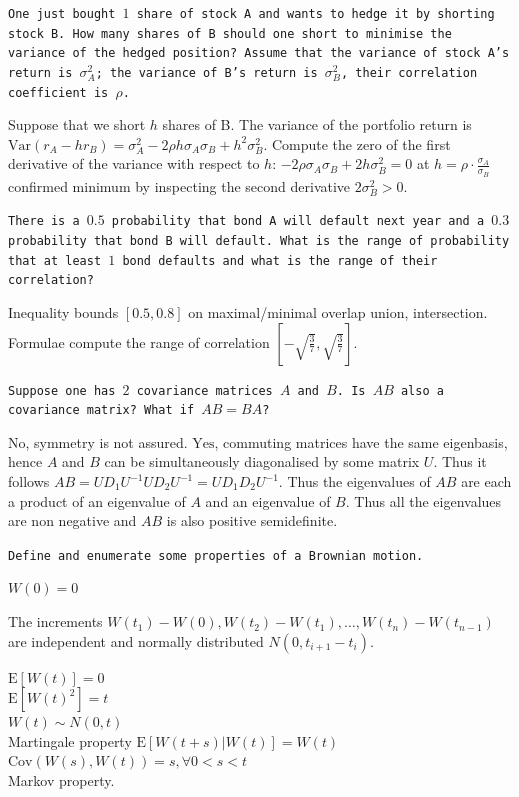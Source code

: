 \texttt{One just bought $1$ share of stock A and wants to hedge it by shorting stock B. How many shares of B should one short to minimise the variance of the hedged position? Assume that the variance of stock A's return is $\sigma_A^2$; the variance of B's return is $\sigma_B^2$, their correlation coefficient is $\rho$.}

Suppose that we short $h$ shares of B. The variance of the portfolio return is $\text{Var}(r_A - h r_B)=\sigma_A^2 - 2 \rho h \sigma_A \sigma_B + h^2 \sigma_B^2$. Compute the zero of the first derivative of the variance with respect to $h$: $-2 \rho \sigma_A \sigma_B + 2 h \sigma_B^2 = 0$ at $h = \boxed{\rho \cdot \frac{\sigma_A}{\sigma_B} }$ confirmed minimum by inspecting the second derivative $2 \sigma_B^2 > 0$.

\texttt{There is a $0.5$ probability that bond A will default next year and a $0.3$ probability that bond B will default. What is the range of probability that at least $1$ bond defaults and what is the range of their correlation?}

Inequality bounds $\boxed{[0.5,0.8]}$ on maximal/minimal overlap union, intersection. Formulae compute the range of correlation $\boxed{\left[-\sqrt{\frac{3}{7}},\sqrt{\frac{3}{7}}\right]}$.

\texttt{Suppose one has $2$ covariance matrices $A$ and $B$. Is $AB$ also a covariance matrix? What if $AB=BA$?}

$\boxed{\text{No}}$, symmetry is not assured. $\boxed{\text{Yes}}$, commuting matrices have the same eigenbasis, hence $A$ and $B$ can be simultaneously diagonalised by some matrix $U$. Thus it follows $AB=UD_1 U^{-1}UD_2 U^{-1}=U D_1 D_2 U^{-1}$. Thus the eigenvalues of $AB$ are each a product of an eigenvalue of $A$ and an eigenvalue of $B$. Thus all the eigenvalues are non negative and $AB$ is also positive semidefinite.

\texttt{Define and enumerate some properties of a Brownian motion.}

$W(0)=0$

The increments $W(t_1)-W(0), W(t_2)-W(t_1),\dots, W(t_n)-W(t_{n-1})$ are independent and normally distributed $N(0,t_{i+1}-t_i)$.

$\text{E}[W(t)]=0$ \\
$\text{E}[W(t)^2]=t$ \\
$W(t) \sim N(0,t)$ \\
Martingale property $\text{E}[W(t+s)|W(t)]=W(t)$ \\
$\text{Cov}(W(s),W(t))=s, \forall 0<s<t$ \\
Markov property.

